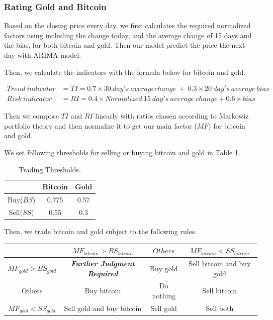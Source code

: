\documentclass[12pt,a4paper]{article}
\begin{document}
\begin{spacing}{1.2}
\subsubsection{Rating Gold and Bitcoin}

Based on the closing price every day, we first calculates the required normalized factors using including the change today, and the average change of 15 days and the bias, for both bitcoin and gold. Then our model predict the price the next day with ARIMA model.

Then, we calculate the indicators with the formula below for bitcoin and gold. 


\begin{align*}
	Trend \ indicator &= TI = 0.7 \times 30 \ day's \ average change \ + \ 0.3 \times 20 \ day's \ average \ bias \\
	Risk \ indicator &= RI = 0.4 \times Normalized \ 15 \ day's \ average \ change + 0.6 \times bias
\end{align*}

Then we compose $TI$ and $RI$ linearly with ratios chosen according to Markowiz portfolio theory and then normalize it to get our main factor ($MF$) for bitcoin and gold. 

We set following thresholds for selling or buying bitcoin and gold in Table \ref{table:threshold}.

\begin{table}[H]
	\renewcommand{\arraystretch}{1.5}
	\caption{Trading Thresholds.}
	\label{table:threshold}
	\begin{center}
		{\footnotesize
			\begin{tabular}{c c c}
				\toprule
				{ } & {Bitcoin} & {Gold} \\
				\midrule
				Buy($BS$) & 0.775 & 0.57 \\
				Sell($SS$) & 0.55 & 0.3 \\
				\bottomrule
		\end{tabular}}
	\end{center}	
\end{table}

Then, we trade bitcoin and gold subject to the following rules.

\begin{center}
	\begin{tabular}{ |c|c|c|c| } 
		\hline
		& $MF_{bitcoin} > BS_{bitcoin}$ & $Others$ & $MF_{bitcoin} < SS_{bitcoin}$ \\ 
		\hline
		$MF_{gold} > BS_{gold}$ & \textbf{\textit{Further Judgment Required}}  & Buy gold & Sell bitcoin and buy gold  \\ 
		\hline
		Others & Buy bitcoin & Do nothing & Sell bitcoin \\
		\hline
		$MF_{gold} < SS_{gold}$ & Sell gold and buy bitcoin & Sell gold & Sell both \\ 
		\hline
	\end{tabular}
\end{center}


\end{spacing}
\end{document}

